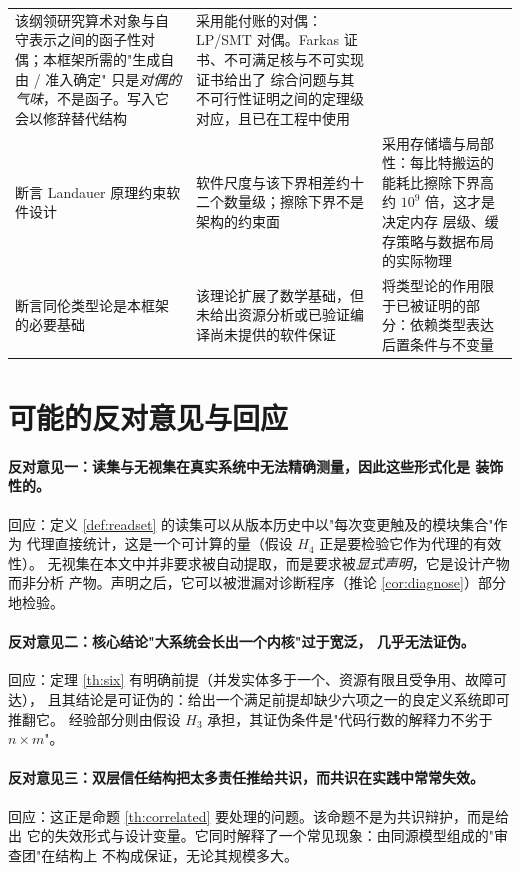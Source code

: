 \begin{longtable}{L{3.4cm}L{5.2cm}L{5.6cm}}
  该纲领研究算术对象与自守表示之间的函子性对偶；本框架所需的"生成自由 / 准入确定"
  只是\emph{对偶的气味}，不是函子。写入它会以修辞替代结构 &
  采用能付账的对偶：LP/SMT 对偶。Farkas 证书、不可满足核与不可实现证书给出了
  综合问题与其不可行性证明之间的定理级对应，且已在工程中使用 \\
断言 Landauer 原理约束软件设计 &
  软件尺度与该下界相差约十二个数量级；擦除下界不是架构的约束面 &
  采用存储墙与局部性：每比特搬运的能耗比擦除下界高约 $10^{9}$ 倍，这才是决定内存
  层级、缓存策略与数据布局的实际物理 \\
断言同伦类型论是本框架的必要基础 &
  该理论扩展了数学基础，但未给出资源分析或已验证编译尚未提供的软件保证 &
  将类型论的作用限于已被证明的部分：依赖类型表达后置条件与不变量
  \cite{hott2013} \\
\bottomrule
\end{longtable}

\section{可能的反对意见与回应}

\paragraph{反对意见一：读集与无视集在真实系统中无法精确测量，因此这些形式化是
装饰性的。}
回应：定义 \ref{def:readset} 的读集可以从版本历史中以"每次变更触及的模块集合"作为
代理直接统计，这是一个可计算的量（假设 $H_4$ 正是要检验它作为代理的有效性）。
无视集在本文中并非要求被自动提取，而是要求被\emph{显式声明}，它是设计产物而非分析
产物。声明之后，它可以被泄漏对诊断程序（推论 \ref{cor:diagnose}）部分地检验。

\paragraph{反对意见二：核心结论"大系统会长出一个内核"过于宽泛，
几乎无法证伪。}
回应：定理 \ref{th:six} 有明确前提（并发实体多于一个、资源有限且受争用、故障可达），
且其结论是可证伪的：给出一个满足前提却缺少六项之一的良定义系统即可推翻它。
经验部分则由假设 $H_3$ 承担，其证伪条件是"代码行数的解释力不劣于 $n \times m$"。

\paragraph{反对意见三：双层信任结构把太多责任推给共识，而共识在实践中常常失效。}
回应：这正是命题 \ref{th:correlated} 要处理的问题。该命题不是为共识辩护，而是给出
它的失效形式与设计变量。它同时解释了一个常见现象：由同源模型组成的"审查团"在结构上
不构成保证，无论其规模多大。

